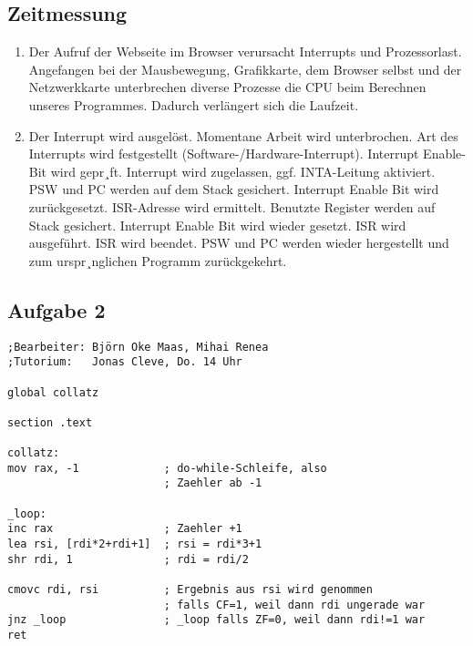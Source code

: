 \documentclass[paper=a4, english, ngerman]{scrartcl}
\begin{document}
	\subsection*{Zeitmessung}
	\begin{enumerate}
	\item Der Aufruf der Webseite im Browser verursacht Interrupts und Prozessorlast. Angefangen bei der Mausbewegung, Grafikkarte, dem Browser selbst und der Netzwerkkarte unterbrechen diverse Prozesse die CPU beim Berechnen unseres Programmes. Dadurch verlängert sich die Laufzeit.
	
	\item Der Interrupt wird ausgelöst. Momentane Arbeit wird unterbrochen. Art des Interrupts wird festgestellt (Software-/Hardware-Interrupt). Interrupt Enable-Bit wird gepr¸ft. Interrupt wird zugelassen, ggf. INTA-Leitung aktiviert. PSW und PC werden auf dem Stack gesichert. Interrupt Enable Bit wird zurückgesetzt. ISR-Adresse wird ermittelt. Benutzte Register werden auf Stack gesichert. Interrupt Enable Bit wird wieder gesetzt. ISR wird ausgeführt. ISR wird beendet. PSW und PC werden wieder hergestellt und zum urspr¸nglichen Programm zurückgekehrt.
	\end{enumerate}

\pagebreak

	\subsection*{Aufgabe 2}
\begin{lstlisting}
;Bearbeiter: Björn Oke Maas, Mihai Renea
;Tutorium:   Jonas Cleve, Do. 14 Uhr

global collatz

section .text

collatz:
mov rax, -1				; do-while-Schleife, also
						; Zaehler ab -1

_loop:
inc rax					; Zaehler +1
lea rsi, [rdi*2+rdi+1]	; rsi = rdi*3+1
shr rdi, 1				; rdi = rdi/2

cmovc rdi, rsi			; Ergebnis aus rsi wird genommen
						; falls CF=1, weil dann rdi ungerade war
jnz _loop				; _loop falls ZF=0, weil dann rdi!=1 war
ret




\end{lstlisting}
\end{document}
